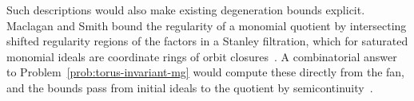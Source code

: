 \documentclass[11pt,reqno]{amsart}
\newtheorem{prop}[lemma]{Proposition}
\theoremstyle{remark}
\newcommand{\reg}{\operatorname{reg}}
\newcommand{\Pic}{\operatorname{Pic}}
\newcommand{\dd}{\mathbf{d}}
\newcommand{\NN}{\mathbb{N}}
\newcommand{\cI}{\mathcal{I}}
\newcommand{\cO}{\mathcal{O}}
\begin{document}
Such descriptions would also make existing degeneration bounds explicit. Maclagan and Smith bound the regularity of a monomial quotient by intersecting shifted regularity regions of the factors in a Stanley filtration, which for saturated monomial ideals are coordinate rings of orbit closures~\cite[Theorem~4.1]{maclaganSmith05}. A combinatorial answer to Problem~\ref{prob:torus-invariant-mg} would compute these directly from the fan, and the bounds pass from initial ideals to the quotient by semicontinuity~\cite[Proposition~6.13]{maclaganSmith04}.

%
%
\end{document}
